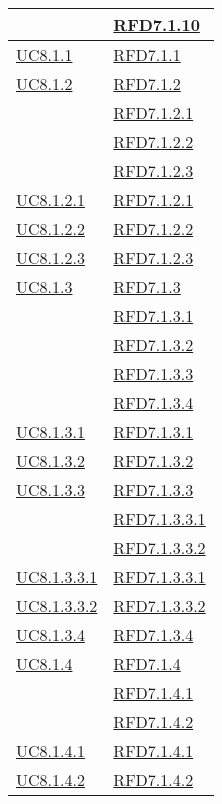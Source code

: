 \begin{longtable}{|>{\centering}m{5cm}|m{5cm}<{\centering}|}
& \hyperlink{RFD7.1.10}{RFD7.1.10}\\ \hline
\hyperref[UC8.1.1]{UC8.1.1} & \hyperlink{RFD7.1.1}{RFD7.1.1}\\ \hline
\hyperref[UC8.1.2]{UC8.1.2} & \hyperlink{RFD7.1.2}{RFD7.1.2}\\
& \hyperlink{RFD7.1.2.1}{RFD7.1.2.1}\\
& \hyperlink{RFD7.1.2.2}{RFD7.1.2.2}\\
& \hyperlink{RFD7.1.2.3}{RFD7.1.2.3}\\ \hline
\hyperref[UC8.1.2.1]{UC8.1.2.1} & \hyperlink{RFD7.1.2.1}{RFD7.1.2.1}\\ \hline
\hyperref[UC8.1.2.2]{UC8.1.2.2} & \hyperlink{RFD7.1.2.2}{RFD7.1.2.2}\\ \hline
\hyperref[UC8.1.2.3]{UC8.1.2.3} & \hyperlink{RFD7.1.2.3}{RFD7.1.2.3}\\ \hline
\hyperref[UC8.1.3]{UC8.1.3} & \hyperlink{RFD7.1.3}{RFD7.1.3}\\
& \hyperlink{RFD7.1.3.1}{RFD7.1.3.1}\\
& \hyperlink{RFD7.1.3.2}{RFD7.1.3.2}\\
& \hyperlink{RFD7.1.3.3}{RFD7.1.3.3}\\
& \hyperlink{RFD7.1.3.4}{RFD7.1.3.4}\\ \hline
\hyperref[UC8.1.3.1]{UC8.1.3.1} & \hyperlink{RFD7.1.3.1}{RFD7.1.3.1}\\ \hline
\hyperref[UC8.1.3.2]{UC8.1.3.2} & \hyperlink{RFD7.1.3.2}{RFD7.1.3.2}\\ \hline
\hyperref[UC8.1.3.3]{UC8.1.3.3} & \hyperlink{RFD7.1.3.3}{RFD7.1.3.3}\\
& \hyperlink{RFD7.1.3.3.1}{RFD7.1.3.3.1}\\
& \hyperlink{RFD7.1.3.3.2}{RFD7.1.3.3.2}\\ \hline
\hyperref[UC8.1.3.3.1]{UC8.1.3.3.1} & \hyperlink{RFD7.1.3.3.1}{RFD7.1.3.3.1}\\ \hline
\hyperref[UC8.1.3.3.2]{UC8.1.3.3.2} & \hyperlink{RFD7.1.3.3.2}{RFD7.1.3.3.2}\\ \hline
\hyperref[UC8.1.3.4]{UC8.1.3.4} & \hyperlink{RFD7.1.3.4}{RFD7.1.3.4}\\ \hline
\hyperref[UC8.1.4]{UC8.1.4} & \hyperlink{RFD7.1.4}{RFD7.1.4}\\
& \hyperlink{RFD7.1.4.1}{RFD7.1.4.1}\\
& \hyperlink{RFD7.1.4.2}{RFD7.1.4.2}\\ \hline
\hyperref[UC8.1.4.1]{UC8.1.4.1} & \hyperlink{RFD7.1.4.1}{RFD7.1.4.1}\\ \hline
\hyperref[UC8.1.4.2]{UC8.1.4.2} & \hyperlink{RFD7.1.4.2}{RFD7.1.4.2}\\ \hline

\end{longtable}
